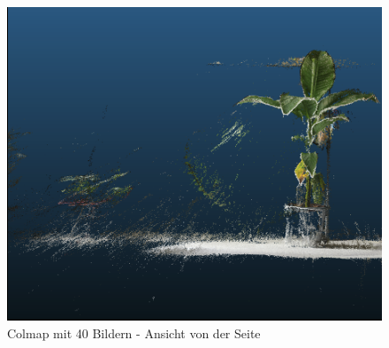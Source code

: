 \documentclass[12pt,titlepage, twoside]{article}
\begin{document}
\begin{figure}
\begin{minipage}{0.475\textwidth}
        \includegraphics[width=1.0\textwidth]{./Images/ColmapNoise2.png}
        \caption{Colmap mit 40 Bildern - Ansicht von der Seite}
        \label{fig:ColmapNoise}
    \end{minipage}
\end{figure}
\end{document}
